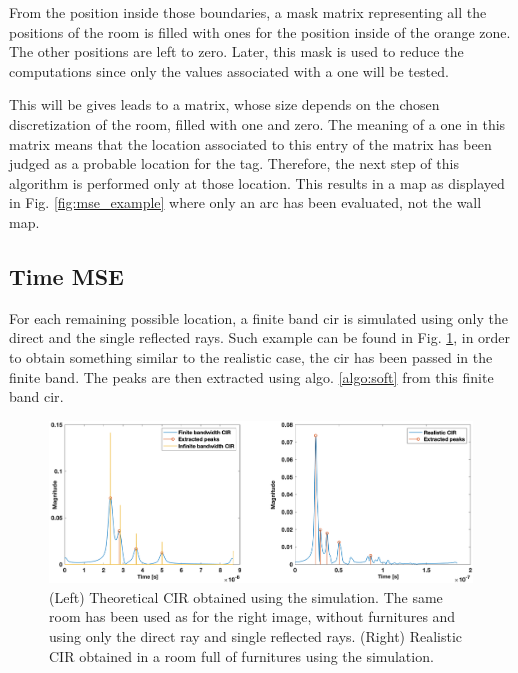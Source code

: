From the position inside those boundaries, a mask matrix representing all the positions of the room is filled with ones for the position inside of the orange zone. The other positions are left to zero. Later, this mask is used to reduce the computations since only the values associated with a one will be tested.
\vspace{2mm}

This will be gives leads to a matrix, whose size depends on the chosen discretization of the room, filled with one and zero. The meaning of a one in this matrix means that the location associated to this entry of the matrix has been judged as a probable location for the tag. Therefore, the next step of this algorithm is performed only at those location. This results in a map as displayed in Fig. \ref{fig:mse_example} where only an arc has been evaluated, not the wall map.

\subsection{Time MSE}

For each remaining possible location, a finite band \gls{cir} is simulated using only the direct and the single reflected rays. Such example can be found in Fig. \ref{fig:soft_simu}, in order to obtain something similar to the realistic case, the \gls{cir} has been passed in the finite band. The peaks are then extracted using algo. \ref{algo:soft} from this finite band \gls{cir}.

\begin{figure}[H]
\centering
\includegraphics[width=\linewidth]{Images/inf_vs_fin.png}
\caption{(Left) Theoretical CIR obtained using the simulation. The same room has been used as for the right image, without furnitures and using only the direct ray and single reflected rays.  (Right) Realistic CIR obtained in a room full of furnitures using the simulation.\label{fig:soft_simu}}
\end{figure}

